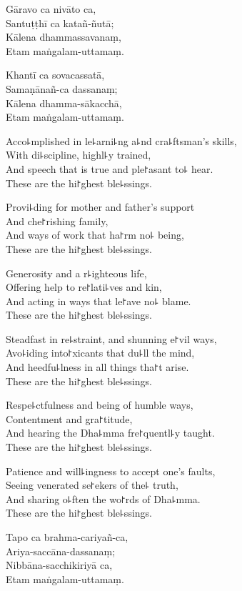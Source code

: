 Gāravo ca nivāto ca,\\
Santuṭṭhī ca katañ-ñutā;\\
Kālena dhammassavanaṃ,\\
Etam maṅgalam-uttamaṃ.

Khantī ca sovacassatā,\\
Samaṇānañ-ca dassanaṃ;\\
Kālena dhamma-sākacchā,\\
Etam maṅgalam-uttamaṃ.

\clearpage

Acco꜕mplished in le꜕arni꜕ng a꜕nd cra꜕ftsman's skills,\\%
With di꜕scipline, highl꜕y trained,\\
And speech that is true and ple꜓asant to꜕ hear.\\
These are the hi꜓ghest ble꜕ssings.

Provi꜕ding for mother and father's support\\
And che꜓rishing family,\\
And ways of work that ha꜓rm no꜕ being,\\
These are the hi꜓ghest ble꜕ssings.

Generosity and a r꜕ighteous life,\\
Offering help to re꜓lati꜕ves and kin,\\
And acting in ways that le꜓ave no꜕ blame.\\
These are the hi꜓ghest ble꜕ssings.

Steadfast in re꜕straint, and shunning e꜓vil ways,\\
Avo꜕iding into꜓xicants that du꜕ll the mind,\\
And heedfu꜕lness in all things tha꜓t arise.\\
These are the hi꜓ghest ble꜕ssings.

Respe꜕ctfulness and being of humble ways,\\
Contentment and gra꜓titude,\\
And hearing the Dha꜕mma fre꜓quentl꜕y taught.\\
These are the hi꜓ghest ble꜕ssings.

Patience and will꜕ingness to accept one's faults,\\
Seeing venerated se꜓ekers of the꜕ truth,\\
And sharing o꜕ften the wo꜓rds of Dha꜕mma.\\
These are the hi꜓ghest ble꜕ssings.

\clearpage

Tapo ca brahma-cariyañ-ca,\\%
Ariya-saccāna-dassanaṃ;\\
Nibbāna-sacchikiriyā ca,\\
Etam maṅgalam-uttamaṃ.

